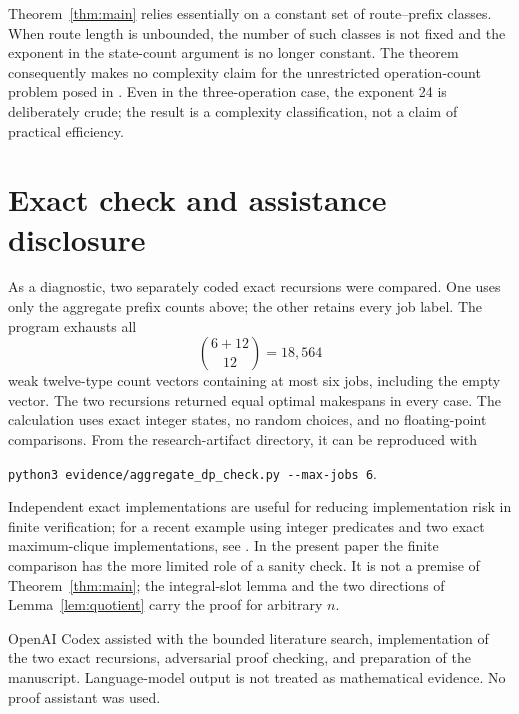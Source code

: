 \documentclass[11pt]{article}
\begin{document}
Theorem~\ref{thm:main} relies essentially on a constant set of route--prefix
classes.  When route length is unbounded, the number of such classes is not
fixed and the exponent in the state-count argument is no longer constant.
The theorem consequently makes no complexity claim for the unrestricted
operation-count problem posed in \cite{TellacheAzerine2026}.  Even in the
three-operation case, the exponent 24 is deliberately crude; the result is a
complexity classification, not a claim of practical efficiency.

\section{Exact check and assistance disclosure}

As a diagnostic, two separately coded exact recursions were compared.  One
uses only the aggregate prefix counts above; the other retains every job
label.  The program exhausts all
\[
 \binom{6+12}{12}=18{,}564
\]
weak twelve-type count vectors containing at most six jobs, including the
empty vector.  The two recursions returned equal optimal makespans in every
case.  The calculation uses exact integer states, no random choices, and no
floating-point comparisons.  From the research-artifact directory, it can be
reproduced with
\begin{center}
\texttt{python3 evidence/aggregate\_dp\_check.py -{}-max-jobs 6}.
\end{center}

Independent exact implementations are useful for reducing implementation
risk in finite verification; for a recent example using integer predicates
and two exact maximum-clique implementations, see
\cite{ZengEtAl2026Certificates}.  In the present paper the finite comparison
has the more limited role of a sanity check.  It is not a premise of
Theorem~\ref{thm:main}; the integral-slot lemma and the two directions of
Lemma~\ref{lem:quotient} carry the proof for arbitrary $n$.

OpenAI Codex assisted with the bounded literature search, implementation of
the two exact recursions, adversarial proof checking, and preparation of the
manuscript.  Language-model output is not treated as mathematical evidence.
No proof assistant was used.



\end{document}
